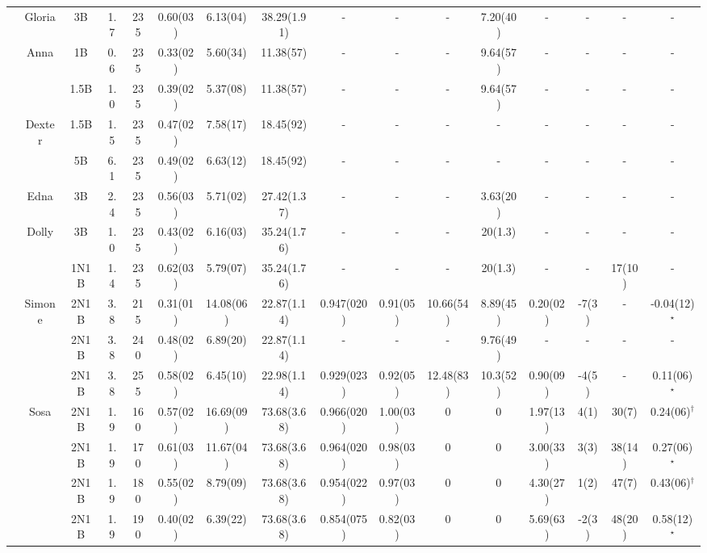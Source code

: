 \begin{table}
\begin{center}
\begin{tabular}{|c|c|ccc|ccc|ccccc|cc|c|}
			\cline{2-16}
			& Gloria & 3B & 1.7 & 235 & 0.60(03) & 6.13(04) & 38.29(1.91) & - & - & - & 7.20(40) & - & - & - & - \\
			\cline{2-16}
			& \multirow{2}{*}{Anna} & 1B & 0.6 & 235 & 0.33(02) & 5.60(34) & 11.38(57) & - & - & - & 9.64(57) & - & - & - & - \\
			& & 1.5B & 1.0 & 235 & 0.39(02) & 5.37(08) & 11.38(57) & - & - & - & 9.64(57) & - & - & - & - \\
			\cline{2-16}
			& \multirow{2}{*}{Dexter} & 1.5B & 1.5 & 235 & 0.47(02) & 7.58(17) & 18.45(92) & - & - & - & - & - & - & - & - \\
			& & 5B & 6.1 & 235 & 0.49(02) & 6.63(12) & 18.45(92) & - & - & - & - & - & - & - & - \\
			\cline{2-16}
			& Edna & 3B & 2.4 & 235 & 0.56(03) & 5.71(02) & 27.42(1.37) & - & - & - & 3.63(20) & - & - & - & - \\
			\cline{2-16}
			& \multirow{2}{*}{Dolly} & 3B & 1.0 & 235 & 0.43(02) & 6.16(03) & 35.24(1.76) & - & - & - & 20(1.3) & - & - & - & - \\
			& & 1N1B & 1.4 & 235 & 0.62(03) & 5.79(07) & 35.24(1.76) & - & - & - & 20(1.3) & - & - & 17(10) & - \\
			\cline{2-16}
			& \multirow{3}{*}{Simone} & 2N1B & 3.8 & 215 & 0.31(01) & 14.08(06) & 22.87(1.14) & 0.947(020)  & 0.91(05) & 10.66(54) & 8.89(45) & 0.20(02) & -7(3) & - & -0.04(12)$^\star$ \\
			& & 2N1B & 3.8 & 240 & 0.48(02) & 6.89(20) & 22.87(1.14) & - & - & - & 9.76(49) & - & - & - & - \\
			& & 2N1B & 3.8 & 255 & 0.58(02) & 6.45(10) & 22.98(1.14) & 0.929(023) & 0.92(05) & 12.48(83) & 10.3(52) & 0.90(09) & -4(5) & - & 0.11(06)$^\star$ \\
			\cline{2-16}
			& \multirow{5}{*}{Sosa} & 2N1B & 1.9 & 160 & 0.57(02) & 16.69(09) & 73.68(3.68) & 0.966(020) & 1.00(03) & 0 & 0 & 1.97(13) & 4(1) & 30(7) & 0.24(06)$^\dagger$ \\
			&  & 2N1B & 1.9 & 170 & 0.61(03) & 11.67(04) & 73.68(3.68) & 0.964(020) & 0.98(03) & 0 & 0 & 3.00(33) & 3(3) & 38(14) & 0.27(06)$^\star$ \\
			&  & 2N1B & 1.9 & 180 & 0.55(02) & 8.79(09) & 73.68(3.68) & 0.954(022) & 0.97(03) & 0 & 0 & 4.30(27) & 1(2) & 47(7) & 0.43(06)$^\dagger$ \\
			&  & 2N1B & 1.9 & 190 & 0.40(02) & 6.39(22) & 73.68(3.68) & 0.854(075) & 0.82(03) & 0 & 0 & 5.69(63) & -2(3) & 48(20) & 0.58(12)$^\star$ \\

\end{tabular}
\end{center}
\end{table}
